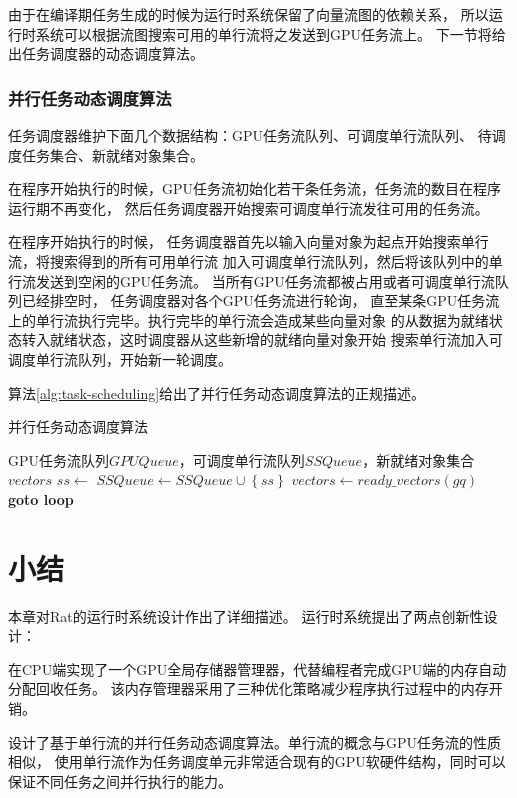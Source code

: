 由于在编译期任务生成的时候为运行时系统保留了向量流图的依赖关系，
所以运行时系统可以根据流图搜索可用的单行流将之发送到GPU任务流上。
下一节将给出任务调度器的动态调度算法。

\subsubsection{并行任务动态调度算法}
任务调度器维护下面几个数据结构：GPU任务流队列、可调度单行流队列、
待调度任务集合、新就绪对象集合。

在程序开始执行的时候，GPU任务流初始化若干条任务流，任务流的数目在程序运行期不再变化，
然后任务调度器开始搜索可调度单行流发往可用的任务流。

在程序开始执行的时候，
任务调度器首先以输入向量对象为起点开始搜索单行流，将搜索得到的所有可用单行流
加入可调度单行流队列，然后将该队列中的单行流发送到空闲的GPU任务流。
当所有GPU任务流都被占用或者可调度单行流队列已经排空时，
任务调度器对各个GPU任务流进行轮询，
直至某条GPU任务流上的单行流执行完毕。执行完毕的单行流会造成某些向量对象
的从数据为就绪状态转入就绪状态，这时调度器从这些新增的就绪向量对象开始
搜索单行流加入可调度单行流队列，开始新一轮调度。

算法\ref{alg:task-scheduling}给出了并行任务动态调度算法的正规描述。
\begin{algorithm}
  \caption{并行任务动态调度算法}
  \label{alg:task-scheduling}
  \begin{algorithmic}[1]
    \Require GPU任务流队列$GPUQueue$，可调度单行流队列$SSQueue$，新就绪对象集合$vectors$
    \Loop
    \State $ss \leftarrow$ 
    \State $SSQueue \leftarrow SSQueue \cup \left\{ ss \right\}$
    \EndFor
    \State $vectors \leftarrow ready\_vectors(gq)$
    \State \textbf{goto loop} 
    \EndIf
    \EndFor
    \EndIf
    \EndLoop
    \EndFunction
  \end{algorithmic}
\end{algorithm}



\section{小结}
本章对Rat的运行时系统设计作出了详细描述。
运行时系统提出了两点创新性设计：

在CPU端实现了一个GPU全局存储器管理器，代替编程者完成GPU端的内存自动分配回收任务。
该内存管理器采用了三种优化策略减少程序执行过程中的内存开销。

设计了基于单行流的并行任务动态调度算法。单行流的概念与GPU任务流的性质相似，
使用单行流作为任务调度单元非常适合现有的GPU软硬件结构，同时可以
保证不同任务之间并行执行的能力。

